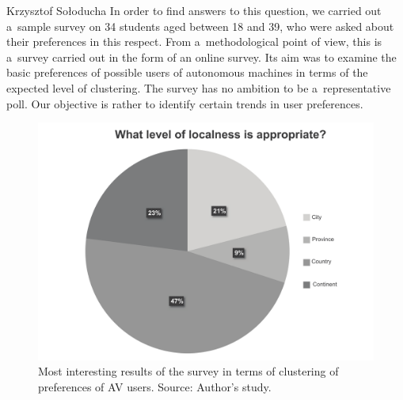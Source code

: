 \begin{artengenv}{Krzysztof Sołoducha}
In order to find answers to this question, we carried out a~sample survey on 34 students aged between 18 and 39, who were asked about their preferences in this respect. From a~methodological point of view, this is a~survey carried out in the form of an online survey. Its aim was to examine the basic preferences of possible users of autonomous machines in terms of the expected level of clustering. The survey has no ambition to be a~representative poll. Our objective is rather to identify certain trends in user preferences.
\enlargethispage{2\baselineskip}
\begin{figure}[H]
 \begin{center}
 \includegraphics[width=.8\textwidth]{ART_Soloducha/illustration1.pdf}%
 \end{center}%
 \caption{Most interesting results of the survey in terms of clustering of preferences of AV users. Source: Author's study.}\label{sol-ill1}
\end{figure}


\end{artengenv}

